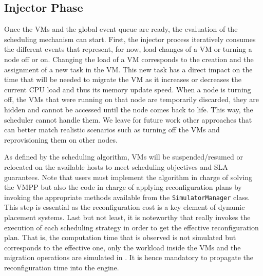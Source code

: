 \subsection{Injector Phase}

Once the VMs and the global event queue are ready, the evaluation of
the scheduling mechanism can start. First, the injector process
iteratively consumes the different events that represent, for now,
load changes of a VM or turning a node off or on. Changing the load of
a VM corresponds to the creation and the assignment of a new \sg task
in the VM. This new task has a direct impact on the time that will be
needed to migrate the VM as it increases or decreases the current CPU
load and thus%
its memory update speed.  
When a node is turning off, the VMs that were running on that node are
temporarily discarded, \ie they are hidden and cannot be accessed
until the node comes back to life. This way, the scheduler cannot
handle them.
We leave for future work other approaches that can better
match realistic scenarios such as turning off the VMs and
reprovisioning them on other nodes.
%

As defined by the scheduling algorithm, VMs will be suspended/resumed
or relocated on the available hosts to meet scheduling objectives and
SLA guarantees.  Note that users must implement the algorithm in
charge of solving the VMPP but also the code in charge of applying
reconfiguration plans by invoking the appropriate methods available
from the \texttt{SimulatorManager} class. This step is essential as
the reconfiguration cost is a key element of dynamic placement
systems.    Last
but not least, it is noteworthy that \vmps really invokes the
execution of each scheduling strategy in order to get the effective
reconfiguration plan.  That is, the computation time that is observed
is not simulated but corresponds to the effective one, only the
workload inside the VMs and the migration operations are simulated in
\sg. It is hence mandatory to propagate the reconfiguration time into
the \sg engine.%

